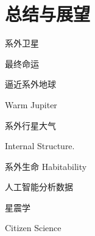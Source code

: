 \chapter{总结与展望}

系外卫星



最终命运

逼近系外地球

Warm Jupiter

系外行星大气

Internal Structure.

系外生命 Habitability

人工智能分析数据

星震学

Citizen Science

